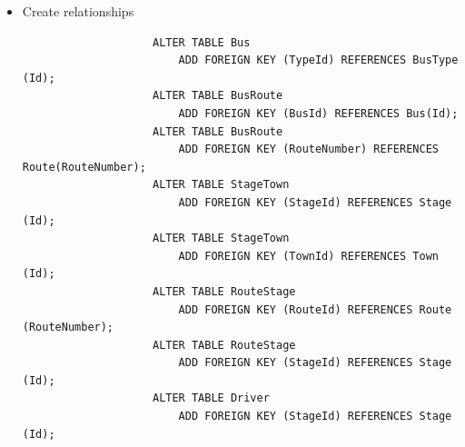 \documentclass[12pt,titlepage]{article}
\begin{document}
\begin{enumerate}[label=\alph*.)]
{\begin{itemize}
{\begin{verbatim}
                    CREATE TABLE Driver
                    (
                        Id              INT          NOT NULL PRIMARY KEY AUTO_INCREMENT,
                        Name            VARCHAR(255) NOT NULL,
                        Address         VARCHAR(255) NOT NULL,
                        EmployeeNumber  CHAR(15)     NOT NULL,
                        TelephoneNumber VARCHAR(13)  NOT NULL,
                        StageId         INT          NOT NULL
                    );
                \end{verbatim}
            }
            \item {
                Create relationships

                \begin{verbatim}
                    ALTER TABLE Bus
                        ADD FOREIGN KEY (TypeId) REFERENCES BusType (Id);
                    ALTER TABLE BusRoute
                        ADD FOREIGN KEY (BusId) REFERENCES Bus(Id);
                    ALTER TABLE BusRoute
                        ADD FOREIGN KEY (RouteNumber) REFERENCES Route(RouteNumber);
                    ALTER TABLE StageTown
                        ADD FOREIGN KEY (StageId) REFERENCES Stage (Id);
                    ALTER TABLE StageTown
                        ADD FOREIGN KEY (TownId) REFERENCES Town (Id);
                    ALTER TABLE RouteStage
                        ADD FOREIGN KEY (RouteId) REFERENCES Route (RouteNumber);
                    ALTER TABLE RouteStage
                        ADD FOREIGN KEY (StageId) REFERENCES Stage (Id);
                    ALTER TABLE Driver
                        ADD FOREIGN KEY (StageId) REFERENCES Stage (Id);
                \end{verbatim}
            }
        \end{itemize}
    }
\end{enumerate}

\pagebreak
\end{document}
